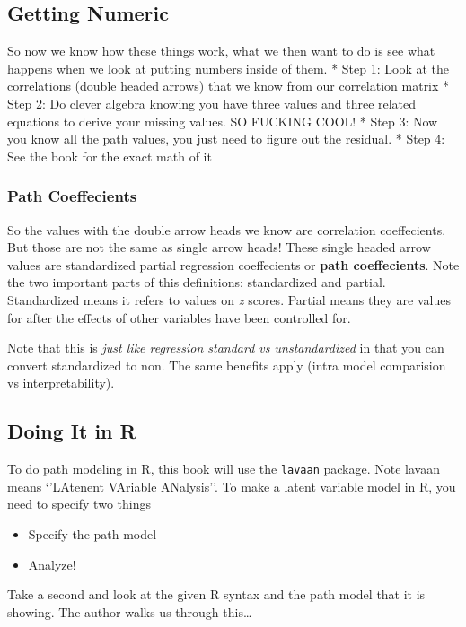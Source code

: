 \documentclass[]{book}
\providecommand{\tightlist}{%
  \setlength{\itemsep}{0pt}\setlength{\parskip}{0pt}}
\theoremstyle{definition}
\theoremstyle{definition}
\theoremstyle{definition}
\theoremstyle{remark}
\begin{document}
\subsection{Getting Numeric}\label{getting-numeric}

So now we know how these things work, what we then want to do is see
what happens when we look at putting numbers inside of them. * Step 1:
Look at the correlations (double headed arrows) that we know from our
correlation matrix * Step 2: Do clever algebra knowing you have three
values and three related equations to derive your missing values. SO
FUCKING COOL! * Step 3: Now you know all the path values, you just need
to figure out the residual. * Step 4: See the book for the exact math of
it

\subsubsection{Path Coeffecients}\label{path-coeffecients}

So the values with the double arrow heads we know are correlation
coeffecients. But those are not the same as single arrow heads! These
single headed arrow values are standardized partial regression
coeffecients or \textbf{path coeffecients}. Note the two important parts
of this definitions: standardized and partial. Standardized means it
refers to values on \emph{z} scores. Partial means they are values for
after the effects of other variables have been controlled for.

Note that this is \emph{just like regression standard vs unstandardized}
in that you can convert standardized to non. The same benefits apply
(intra model comparision vs interpretability).

\subsection{Doing It in R}\label{doing-it-in-r}

To do path modeling in R, this book will use the \texttt{lavaan}
package. Note lavaan means `'LAtenent VAriable ANalysis''. To make a
latent variable model in R, you need to specify two things

\begin{itemize}
\tightlist
\item
  Specify the path model
\item
  Analyze!
\end{itemize}

Take a second and look at the given R syntax and the path model that it
is showing. The author walks us through this\ldots{}
\end{document}
